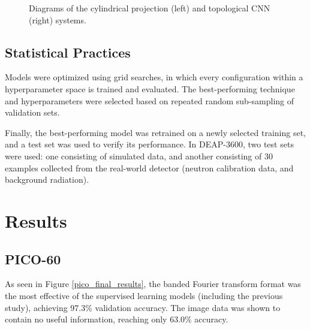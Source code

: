 \documentclass[12pt]{article}
\begin{document}
\begin{figure}[ht]
    \centering
    \qquad
    \caption{\label{deap_methods} Diagrams of the cylindrical projection (left) and topological CNN (right) systems.}
\end{figure}

\subsection{Statistical Practices}

Models were optimized using grid searches, in which every configuration within a hyperparameter space is trained and evaluated. The best-performing technique and hyperparameters were selected based on repeated random sub-sampling of validation sets.

Finally, the best-performing model was retrained on a newly selected training set, and a test set was used to verify its performance. In DEAP-3600, two test sets were used: one consisting of simulated data, and another consisting of 30 examples collected from the real-world detector (neutron calibration data, and background radiation).

\section{Results}

\subsection{PICO-60}

As seen in Figure \ref{pico_final_results}, the banded Fourier transform format was the most effective of the supervised learning models (including the previous study), achieving 97.3\% validation accuracy. The image data was shown to contain no useful information, reaching only 63.0\% accuracy.
\end{document}
